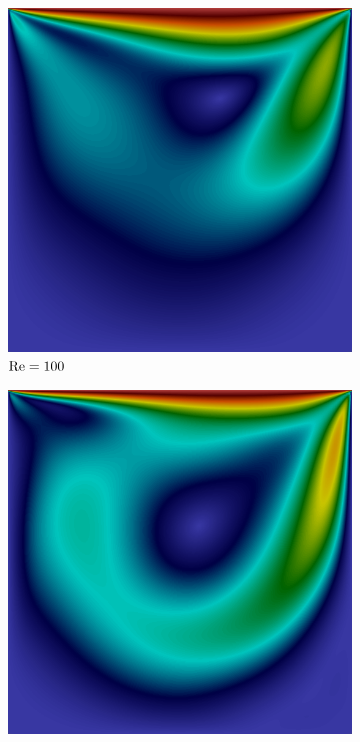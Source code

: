 \begin{figure}[h!]
    \centering
    \caption{Campo de velocidades em regime estacionário na cavidade.}
    \begin{subfigure}{0.32\textwidth}
        \includegraphics[width=\linewidth]{Figuras/Cavity/Re100.png}
        \caption{$\mathrm{Re}=100$}
    \end{subfigure}
    \begin{subfigure}{0.32\textwidth}
        \includegraphics[width=\linewidth]{Figuras/Cavity/Re400.png}

\end{subfigure}
\end{figure}
